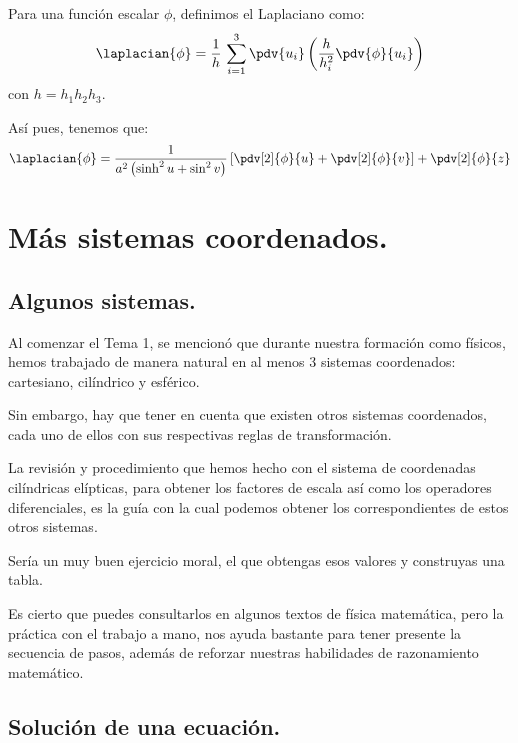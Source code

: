 Para una función escalar $\phi$, definimos el Laplaciano como:
\begin{align*}
\laplacian{\phi} = \dfrac{1}{h} \, \sum_{i=1}^{3} \pdv{u_{i}} \left( \dfrac{h}{h_{i}^{2}}  \pdv{\phi}{u_{i}} \right)
\end{align*}
con $h = h_{1} h_{2} h_{3}$.
\par
Así pues, tenemos que:
\begin{align*}
\laplacian{\phi} = \dfrac{1}{a^{2} \left( \sinh^{2} u + \sin^{2} v \right)} \left[ \pdv[2]{\phi}{u} + \pdv[2]{\phi}{v} \right] + \pdv[2]{\phi}{z}
\end{align*}


\section{Más sistemas coordenados.}

\subsection{Algunos sistemas.}

Al comenzar el Tema 1, se mencionó que durante nuestra formación como físicos, hemos trabajado de manera natural en al menos $3$ sistemas coordenados: cartesiano, cilíndrico y esférico.
\par
Sin embargo, hay que tener en cuenta que existen otros sistemas coordenados, cada uno de ellos con sus respectivas reglas de transformación.
\par
La revisión y procedimiento que hemos hecho con el sistema de coordenadas cilíndricas elípticas, para obtener los factores de escala así como los operadores diferenciales, es la guía con la cual podemos obtener los correspondientes de estos otros sistemas.
\par
Sería un muy buen ejercicio moral, el que obtengas esos valores y construyas una tabla.
\par
Es cierto que puedes consultarlos en algunos textos de física matemática, pero la práctica con el trabajo a mano, nos ayuda bastante para tener presente la secuencia de pasos, además de reforzar nuestras habilidades de razonamiento matemático.

\subsection{Solución de una ecuación.}

